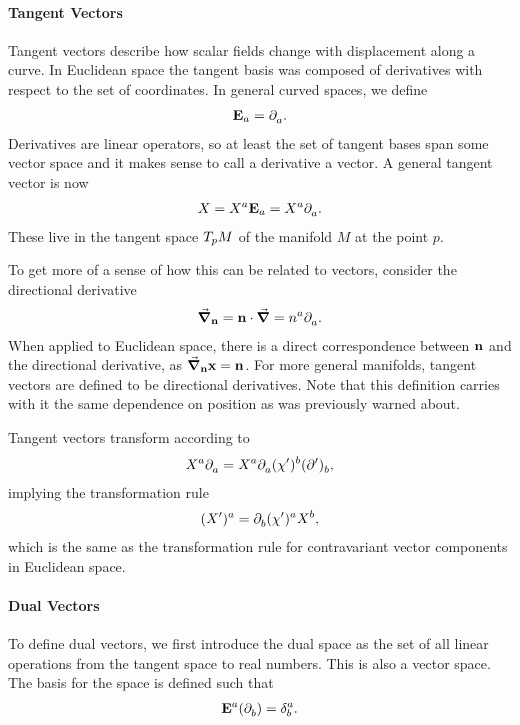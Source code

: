\paragraph{Tangent Vectors}
Tangent vectors describe how scalar fields change with displacement along a curve. In Euclidean space the tangent basis was composed of derivatives with respect to the set of coordinates. In general curved spaces, we define
\begin{align*}
	\vb{E}_{a} = \partial^{}_{a}.
\end{align*}
Derivatives are linear operators, so at least the set of tangent bases span some vector space and it makes sense to call a derivative a vector. A general tangent vector is now
\begin{align*}
	X = X^{a}\vb{E}_{a} = X^{a}\partial^{}_{a}.
\end{align*}
These live in the tangent space $T_{p}M$ of the manifold $M$ at the point $p$.

To get more of a sense of how this can be related to vectors, consider the directional derivative
\begin{align*}
	\grad_{\vb{n}} = \vb{n}\cdot\grad = n^{a}\partial^{}_{a}.
\end{align*}
When applied to Euclidean space, there is a direct correspondence between $\vb{n}$ and the directional derivative, as $\grad_{\vb{n}}{\vb{x}} = \vb{n}$. For more general manifolds, tangent vectors are defined to be directional derivatives. Note that this definition carries with it the same dependence on position as was previously warned about.

Tangent vectors transform according to
\begin{align*}
	X^{a}\partial^{}_{a} = X^{a}\partial^{}_{a}{(\chi^{\prime})^{b}}(\partial^{\prime})^{}_{b},
\end{align*}
implying the transformation rule
\begin{align*}
	(X^{\prime})^{a} = \partial^{}_{b}{(\chi^{\prime})^{a}}X^{b},
\end{align*}
which is the same as the transformation rule for contravariant vector components in Euclidean space.

\paragraph{Dual Vectors}
To define dual vectors, we first introduce the dual space as the set of all linear operations from the tangent space to real numbers. This is also a vector space. The basis for the space is defined such that
\begin{align*}
	\db{a}(\del{}{b}) = \kdelta{a}{b}.
\end{align*}

